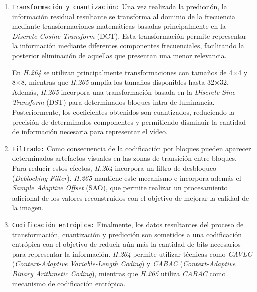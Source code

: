 \begin{enumerate}
  Durante la selección de determinadas decisiones de codificación pueden emplearse técnicas de optimización tasa-distorsión. Una formulación habitual es la función:
 
  \begin{equation}
   J = D + \lambda R
  \end{equation}
 
  donde $D$ representa la distorsión introducida, $R$ la tasa de bits necesaria para representar la información y $\lambda$ el multiplicador de Lagrange utilizado para establecer el equilibrio entre ambos factores.
 
  \item \texttt{Transformación y cuantización:} Una vez realizada la predicción, la información residual resultante se transforma al dominio de la frecuencia mediante transformaciones matemáticas basadas principalmente en la \textit{Discrete Cosine Transform} (DCT). Esta transformación permite representar la información mediante diferentes componentes frecuenciales, facilitando la posterior eliminación de aquellas que presentan una menor relevancia. 

  En \textit{H.264} se utilizan principalmente transformaciones con tamaños de 4$\times$4 y 8$\times$8, mientras que \textit{H.265} amplía los tamaños disponibles hasta 32$\times$32. Además, \textit{H.265} incorpora una transformación basada en la \textit{Discrete Sine Transform} (DST) para determinados bloques intra de luminancia. Posteriormente, los coeficientes obtenidos son cuantizados, reduciendo la precisión de determinados componentes y permitiendo disminuir la cantidad de información necesaria para representar el vídeo.
 
  \item \texttt{Filtrado:} Como consecuencia de la codificación por bloques pueden aparecer determinados artefactos visuales en las zonas de transición entre bloques. Para reducir estos efectos, \textit{H.264} incorpora un filtro de desbloqueo (\textit{Deblocking Filter}). \textit{H.265} mantiene este mecanismo e incorpora además el \textit{Sample Adaptive Offset} (SAO), que permite realizar un procesamiento adicional de los valores reconstruidos con el objetivo de mejorar la calidad de la imagen.
 
  \item \texttt{Codificación entrópica:} Finalmente, los datos resultantes del proceso de transformación, cuantización y predicción son sometidos a una codificación entrópica con el objetivo de reducir aún más la cantidad de bits necesarios para representar la información. \textit{H.264} permite utilizar técnicas como \textit{CAVLC} (\textit{Context-Adaptive Variable-Length Coding}) y \textit{CABAC} (\textit{Context-Adaptive Binary Arithmetic Coding}), mientras que \textit{H.265} utiliza \textit{CABAC} como mecanismo de codificación entrópica.
 \end{enumerate}

